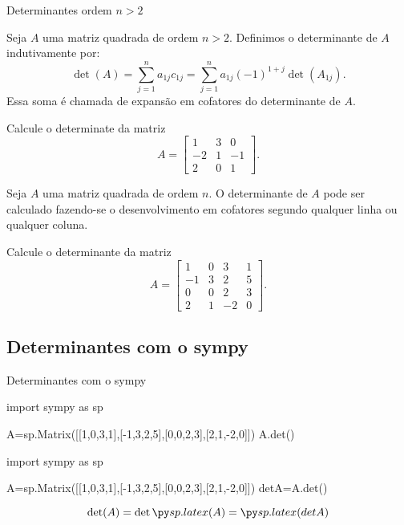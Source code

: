 \begin{frame}[label=determinantes]{Determinantes ordem $n>2$}
\begin{defin}
Seja $A$ uma matriz quadrada de ordem $n>2$. Definimos o {\color{blue}determinante} de $A$ indutivamente por:
\[\det(A)=\sum_{j=1}^{n}a_{1j}c_{1j}=\sum_{j=1}^{n}a_{1j}(-1)^{1+j}\det(A_{1j}).\]
Essa soma é chamada de {\color{blue}expansão em cofatores} do determinante de $A$.
\end{defin}

\begin{exe}
Calcule o determinate da matriz 
\[A=\begin{bmatrix}
1 & 3 & 0 \\ -2 & 1 & -1 \\ 2 & 0 & 1
\end{bmatrix}.\]
\end{exe}

\end{frame}


\begin{frame}[label=determinantes]
\begin{teo}
Seja $A$ uma matriz quadrada de ordem $n$. O determinante de $A$ pode ser calculado fazendo-se o desenvolvimento em cofatores segundo {\color{blue}} qualquer linha ou qualquer coluna.
\end{teo}

\begin{exe}
Calcule o determinante da matriz 
\[
A=\begin{bmatrix}
 1 & 0 & 3 & 1 \\ -1 & 3 & 2 & 5 \\ 	0 & 0 & 2  & 3\\ 2 & 1 & -2 & 0
\end{bmatrix}.
\]
\end{exe}

\end{frame}


\subsection*{Determinantes com o sympy}

\begin{frame}[label=determinantes,fragile=singleslide]{Determinantes com o sympy}
	\begin{footnotesize}
\begin{pyverbatim}
import sympy as sp

A=sp.Matrix([[1,0,3,1],[-1,3,2,5],[0,0,2,3],[2,1,-2,0]])
A.det()
\end{pyverbatim}
	\end{footnotesize}		
\begin{pycode}
import sympy as sp

A=sp.Matrix([[1,0,3,1],[-1,3,2,5],[0,0,2,3],[2,1,-2,0]])
detA=A.det()
\end{pycode}
\[\det(A)=\det \pyl{A}=\pyl{detA}\]
\end{frame}

